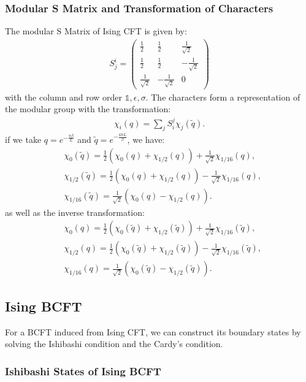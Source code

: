 \subsubsection{Modular S Matrix and Transformation of Characters}
The modular S Matrix of Ising CFT is given by:
\begin{align}
  S^i_j=\begin{pmatrix}
    \frac{1}{2} & \frac{1}{2} & \frac{1}{\sqrt{2}} \\
    \frac{1}{2} & \frac{1}{2} & -\frac{1}{\sqrt{2}} \\
    \frac{1}{\sqrt{2}} & -\frac{1}{\sqrt{2}} & 0
  \end{pmatrix}
\end{align}
with the column and row order $ \mathbb{1},\epsilon,\sigma $. The characters form a representation of the modular group with the transformation:
\begin{align}
  \chi_i\left(q\right)=\sum_j S_{i}^j\chi_j\left(\tilde{q}\right).
\end{align}
if we take $ q = e^{-\frac{\pi \beta}{L}} $ and $ \tilde{q} = e^{-\frac{4\pi L}{\beta}} $, we have:
\begin{align}
  &\chi_0(\tilde{q})=\frac{1}{2}\left(\chi_0(q)+\chi_{1/2}(q)\right)+\frac{1}{\sqrt{2}}\chi_{1/16}(q),\\
  &\chi_{1/2}(\tilde{q})=\frac{1}{2}\left(\chi_0(q)+\chi_{1/2}(q)\right)-\frac{1}{\sqrt{2}}\chi_{1/16}(q),\\
  &\chi_{1/16}(\tilde{q})=\frac{1}{\sqrt{2}}\left(\chi_0(q)-\chi_{1/2}(q)\right).
\end{align}
as well as the inverse transformation:
\begin{align}
  &\chi_0(q)=\frac{1}{2}\left(\chi_0(\tilde{q})+\chi_{1/2}(\tilde{q})\right)+\frac{1}{\sqrt{2}}\chi_{1/16}(\tilde{q}),\\
  &\chi_{1/2}(q)=\frac{1}{2}\left(\chi_0(\tilde{q})+\chi_{1/2}(\tilde{q})\right)-\frac{1}{\sqrt{2}}\chi_{1/16}(\tilde{q}),\\
  &\chi_{1/16}(q)=\frac{1}{\sqrt{2}}\left(\chi_0(\tilde{q})-\chi_{1/2}(\tilde{q})\right).
\end{align}

\subsection{Ising BCFT}
For a BCFT induced from Ising CFT, we can construct its boundary states by solving the Ishibashi condition and the Cardy's condition.

\subsubsection{Ishibashi States of Ising BCFT}


